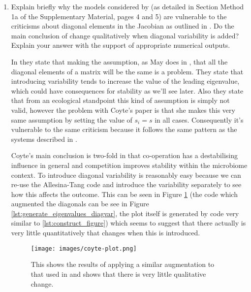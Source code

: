 \documentclass[11pt]{scrreprt}
\begin{document}
\begin{enumerate}
		\newpage
		
		\item Explain briefly why the models considered by \citet{Coyte2015} (as detailed in Section Method 1a of the Supplementary Material, pages 4 and 5) are vulnerable to the criticisms about diagonal elements in the Jacobian as outlined in \cite{James2015}. Do the main conclusion of \citet{Coyte2015} change qualitatively when diagonal variability is added? Explain your answer with the support of appropriate numerical outputs.
		
		In \citet{James2015} they state that making the assumption, as May does in \cite{May1972}, that all the diagonal elements of a matrix will be the same is a problem. They state that introducing variability tends to increase the value of the leading eigenvalue, which could have consequences for stability as we'll see later. Also they state that from an ecological standpoint this kind of assumption is simply not valid, however the problem with Coyte's paper is that she makes this very same assumption by setting the value of $s_i = s$ in all cases. Consequently it's vulnerable to the same criticism because it follows the same pattern as the systems described in \citet{James2015}. 
		
		Coyte's main conclusion is two-fold in that co-operation has a destabilising influence in general and competition improves stability within the microbiome context. To introduce diagonal variability is reasonably easy because we can re-use the Allesina-Tang code and introduce the variability separately to see how this affects the outcome. This can be seen in Figure \ref{fig:coyte_figure} (the code which augmented the diagonals can be see in Figure \ref{lst:generate_eigenvalues_diagvar}, the plot itself is generated by code very similar to \ref{lst:construct_figure}) which seems to suggest that there actually is very little quantitatively that changes when this is introduced. 
		
		\begin{figure}[ht]
			\begin{center}
				\texttt{[image: images/coyte-plot.png]}
			\end{center}
			\caption{This shows the results of applying a similar augmentation to that used in \citet{James2015} and shows that there is very little qualitative change.}
			\label{fig:coyte_figure}
		\end{figure}
		

\end{enumerate}
\end{document}
